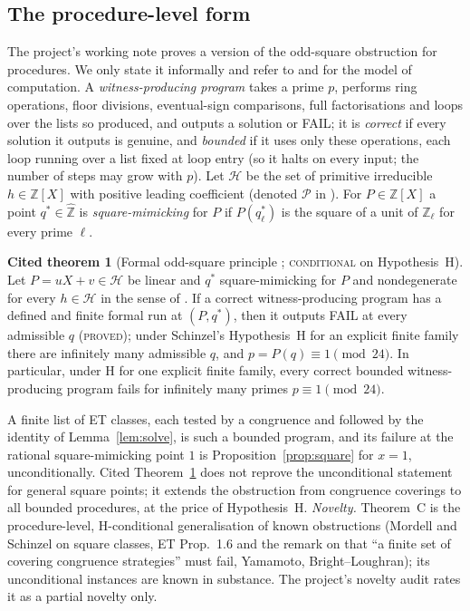 \documentclass[11pt,reqno]{amsart}
\theoremstyle{definition}
\newtheorem{citedthm}[theorem]{Cited theorem}
\newcommand{\Z}{\mathbb Z}
\newcommand{\Zh}{\widehat{\Z}}
\newcommand{\status}[1]{\textup{\textsc{#1}}}
\begin{document}
\subsection{The procedure-level form}
The project's working note \cite{PS} proves a version of the odd-square
obstruction for procedures.  We only state it informally and refer to
\cite[\S\S1--2]{PS} and \cite{PObs} for the model of computation.
A \emph{witness-producing program} takes a prime $p$, performs ring
operations, floor divisions, eventual-sign comparisons, full
factorisations and loops over the lists so produced, and outputs a
solution or FAIL; it is \emph{correct} if every solution it outputs is
genuine, and \emph{bounded} if it uses only these operations, each loop
running over a list fixed at loop entry (so it halts on every input; the
number of steps may grow with $p$).  Let $\mathcal H$ be the set of
primitive irreducible $h\in\Z[X]$ with positive leading coefficient
(denoted $\mathcal P$ in \cite{PS}).  For $P\in\Z[X]$ a point $q^*\in\Zh$ is
\emph{square-mimicking} for $P$ if $P(q^*_\ell)$ is the square of a unit
of $\Z_\ell$ for every prime $\ell$.

\begin{citedthm}[Formal odd-square principle {\cite[Theorem~C,
Corollary~C1]{PS}}; \status{conditional} on Hypothesis~H]\label{cit:C}
Let $P=uX+v\in\mathcal H$ be linear and $q^*$ square-mimicking for $P$
and nondegenerate for every $h\in\mathcal H$ in the sense of
\cite[\S1.2]{PS}.  If a correct witness-producing program has a defined and
finite formal run at $(P,q^*)$, then it outputs FAIL at every admissible
$q$ (\status{proved}); under Schinzel's Hypothesis~H \cite{SS} for an
explicit finite family there are infinitely many admissible $q$, and
$p=P(q)\equiv1\pmod{24}$.  In particular, under H for one explicit
finite family, every correct bounded witness-producing program fails for
infinitely many primes $p\equiv1\pmod{24}$.
\end{citedthm}

A finite list of ET classes, each tested by a congruence and followed by
the identity of Lemma~\ref{lem:solve}, is such a bounded program, and
its failure at the rational square-mimicking point $1$ is
Proposition~\ref{prop:square} for $x=1$, unconditionally.  Cited Theorem~\ref{cit:C} does
not reprove the unconditional statement for general square points; it
extends the obstruction from congruence coverings to all bounded
procedures, at the price of Hypothesis~H.  \emph{Novelty.} Theorem~C is
the procedure-level, H-conditional generalisation of known obstructions
(Mordell and Schinzel on square classes, ET Prop.~1.6 and the remark on
\cite[p.~6]{ET} that ``a finite set of covering congruence strategies''
must fail, Yamamoto, Bright--Loughran); its unconditional instances are
known in substance.  The project's novelty audit rates it as a partial
novelty only.
\end{document}
